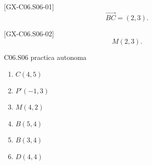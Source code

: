 \begin{shortanswer}{[GX-C06.S06-01]}
\[
\overrightarrow{BC}=(2,3).
\]
\end{shortanswer}

\begin{shortanswer}{[GX-C06.S06-02]}
\[
M(2,3).
\]
\end{shortanswer}

\begin{shortanswer}{C06.S06 practica autonoma}
\begin{enumerate}[label=\textbf{PX-C06.S06-\arabic*:}, leftmargin=*]
  \item \(C(4,5)\)
  \item \(P'(-1,3)\)
  \item \(M(4,2)\)
  \item \(B(5,4)\)
  \item \(B(3,4)\)
  \item \(D(4,4)\)
\end{enumerate}
\end{shortanswer}
